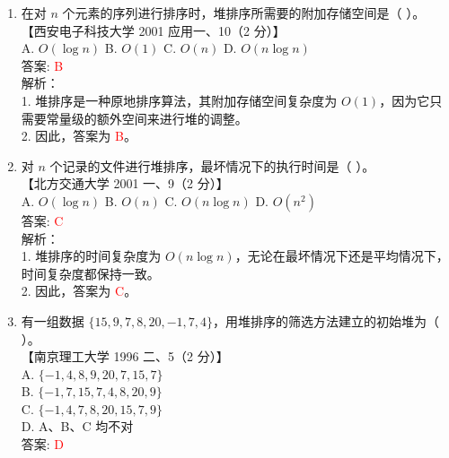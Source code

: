 \documentclass[lang=cn,newtx,10pt,scheme=chinese]{../../../elegantbook}
\begin{document}
\begin{enumerate}
    \item 在对 $n$ 个元素的序列进行排序时，堆排序所需要的附加存储空间是（ ）。\\
    【西安电子科技大学 2001 应用一、10（2 分）】\\  

    A. $O(\log n)$ \quad B. $O(1)$ \quad C. $O(n)$ \quad D. $O(n \log n)$ \\  

    答案: \textcolor{red}{B} \\

    解析：\\
    1. 堆排序是一种原地排序算法，其附加存储空间复杂度为 $O(1)$，因为它只需要常量级的额外空间来进行堆的调整。\\
    2. 因此，答案为 \textcolor{red}{B}。\\

\item 对 $n$ 个记录的文件进行堆排序，最坏情况下的执行时间是（ ）。\\
    【北方交通大学 2001 一、9（2 分）】\\  

    A. $O(\log n)$ \quad B. $O(n)$ \quad C. $O(n \log n)$ \quad D. $O(n^2)$ \\  

    答案: \textcolor{red}{C} \\

    解析：\\
    1. 堆排序的时间复杂度为 $O(n \log n)$，无论在最坏情况下还是平均情况下，时间复杂度都保持一致。\\
    2. 因此，答案为 \textcolor{red}{C}。\\

    \item 有一组数据 $\{15, 9, 7, 8, 20, -1, 7, 4\}$，用堆排序的筛选方法建立的初始堆为（ ）。\\
    【南京理工大学 1996 二、5（2 分）】\\  

    A. $\{-1, 4, 8, 9, 20, 7, 15, 7\}$ \\  

    B. $\{-1, 7, 15, 7, 4, 8, 20, 9\}$ \\  

    C. $\{-1, 4, 7, 8, 20, 15, 7, 9\}$ \\  

    D. A、B、C 均不对 \\  

    答案: \textcolor{red}{D} \\


\end{enumerate}
\end{document}
